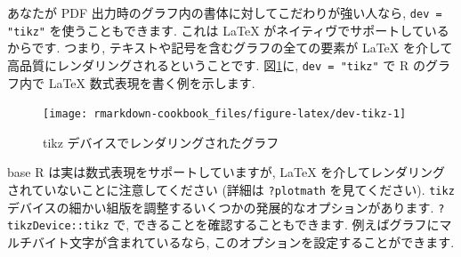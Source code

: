 \documentclass[
  11pt,
]{bxjsreport}
\newenvironment{Shaded}{\begin{snugshade}}{\end{snugshade}}
\newcommand{\AttributeTok}[1]{\textcolor[rgb]{0.77,0.63,0.00}{#1}}
\newcommand{\DecValTok}[1]{\textcolor[rgb]{0.00,0.00,0.81}{#1}}
\newcommand{\FunctionTok}[1]{\textcolor[rgb]{0.00,0.00,0.00}{#1}}
\newcommand{\NormalTok}[1]{#1}
\newcommand{\SpecialCharTok}[1]{\textcolor[rgb]{0.00,0.00,0.00}{#1}}
\newcommand{\StringTok}[1]{\textcolor[rgb]{0.31,0.60,0.02}{#1}}
\begin{document}
あなたが PDF 出力時のグラフ内の書体に対してこだわりが強い人なら, \texttt{dev = "tikz"} を使うこともできます. これは LaTeX がネイティヴでサポートしているからです. つまり, テキストや記号を含むグラフの全ての要素が LaTeX を介して高品質にレンダリングされるということです. 図\ref{fig:dev-tikz}に, \texttt{dev = "tikz"} で R のグラフ内で LaTeX 数式表現を書く例を示します.

\begin{Shaded}
\end{Shaded}

\begin{figure}

{\centering \texttt{[image: rmarkdown-cookbook\_files/figure-latex/dev-tikz-1]} 

}

\caption{tikz デバイスでレンダリングされたグラフ}\label{fig:dev-tikz}
\end{figure}

base R は実は数式表現をサポートしていますが, LaTeX を介してレンダリングされていないことに注意してください (詳細は \texttt{?plotmath} を見てください). \texttt{tikz} デバイスの細かい組版を調整するいくつかの発展的なオプションがあります. \texttt{?tikzDevice::tikz} で, できることを確認することもできます. 例えばグラフにマルチバイト文字が含まれているなら, このオプションを設定することができます.
\end{document}
